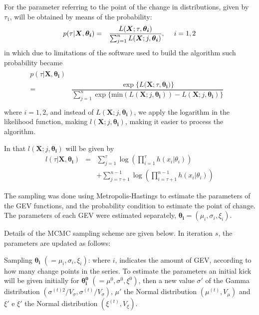 \documentclass{asaproc}
\begin{document}
For the parameter referring to the point of the change in distributions, given by $\tau_{1}$, will be obtained by means of the probability:
\begin{eqnarray}
p(\tau|\boldsymbol{X},\boldsymbol{\theta_{i}}) & = & \frac{L(\boldsymbol{X};\tau,\boldsymbol{\theta_{i}})}{\sum^{n}_{j=1}L(\boldsymbol{X};j,\boldsymbol{\theta_{i}})}, \hspace{3ex} i = 1, 2 \nonumber 
\end{eqnarray}
in which due to limitations of the software used to build the algorithm such probability became
\begin{eqnarray}\label{probtau}
\begin{array}{ccl}
p(\tau|\boldsymbol{X},\boldsymbol{\theta_{i}}) && \\
 = & \dfrac{\exp\{L(\boldsymbol{X};\tau,\boldsymbol{\theta_{i})\}}}{\displaystyle\sum^{n}_{j=1}\exp\{\mbox{min}(L(\boldsymbol{X};j,\boldsymbol{\theta_{i}})) - L(\boldsymbol{X};j,\boldsymbol{\theta_{i}}) \}} \\
\end{array}
\end{eqnarray}
where $i=1,2$, and instead of $L(\boldsymbol{X};j,\boldsymbol{\theta_{i}})$, we apply the logarithm in the likelihood function, making $l(\boldsymbol{X};j,\boldsymbol{\theta_{i}})$, making it easier to process the algorithm.

In that $l(\boldsymbol{X};j,\boldsymbol{\theta_{i}})$  will be given by
\begin{eqnarray}
l(\tau|\boldsymbol{X},\boldsymbol{\theta_{i}}) & = & \sum^{\tau}_{j=1}\log\left(\prod_{i=1}^{\tau}h(x_{i}|\theta_{i})\right) \nonumber \\
&& + \sum^{n-1}_{j=\tau+1}\log\left(\prod_{i=\tau+1}^{n-1}h(x_{i}|\theta_{i})\right) \nonumber 
\end{eqnarray}

The sampling was done using Metropolis-Hastings to estimate the parameters of the GEV functions, and the probability condition to estimate the point of change. The parameters of each GEV were estimated separately, $\boldsymbol{\theta_{i}} = (\mu_{i}, \sigma_{i}, \xi_{i})$.

Details of the MCMC sampling scheme are given below. In iteration $s$, the parameters are updated as follows:

Sampling $\boldsymbol{\theta_{i}}$ $(= \mu_{i}, \sigma_{i}, \xi_{i})$: where $i$, indicates the amount of GEV, according to how many change points in the series. To estimate the parameters an initial kick will be given initially for $\boldsymbol{\theta_{i}^{0}}$ $(= \mu^{0}, \sigma^{0}, \xi^{0})$, then a new value $\sigma'$ of the Gamma distribution $(\sigma^{(t)2}/V_{\sigma},\sigma^{(t)}/V_{\sigma})$, $\mu'$ the Normal distribution $(\mu^{(t)},V_{\mu})$ and $\xi '$ e $\xi '$ the Normal distribution $(\xi^{(t)},V_{\xi})$.
\end{document}
